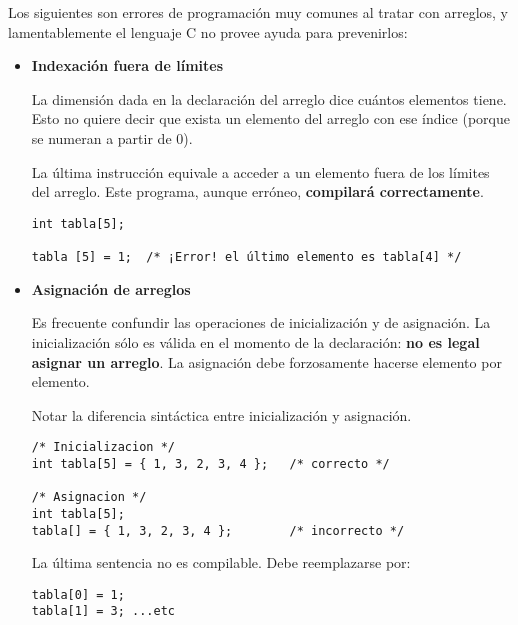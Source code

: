 Los siguientes son errores de programación muy comunes al tratar con arreglos, y lamentablemente el lenguaje C no
provee ayuda para prevenirlos:
\begin{itemize}
\item \textbf{Indexación fuera de límites}
	
La dimensión dada en la declaración del arreglo dice cuántos elementos tiene.
Esto no quiere decir que exista un elemento del arreglo con ese índice (porque
se numeran a partir de 0).


\begin{ejemplo}
La última instrucción equivale a acceder a un elemento fuera de los límites del
arreglo. Este programa, aunque erróneo, \textbf{compilará correctamente}. 
\begin{lstlisting}
int tabla[5];

tabla [5] = 1;	/* ¡Error! el último elemento es tabla[4] */
\end{lstlisting}
\end{ejemplo}





\item \textbf{Asignación de arreglos}

Es frecuente confundir las operaciones de inicialización y de asignación. La
inicialización sólo es válida en el momento de la declaración: \textbf{no es legal
asignar un arreglo}. La asignación debe forzosamente hacerse elemento por
elemento.

\begin{ejemplo}
Notar la diferencia sintáctica entre inicialización y asignación.
\begin{lstlisting}
/* Inicializacion */
int tabla[5] = { 1, 3, 2, 3, 4 }; 	/* correcto */

/* Asignacion */
int tabla[5];
tabla[] = { 1, 3, 2, 3, 4 }; 		/* incorrecto */
\end{lstlisting}
La última sentencia no es compilable. Debe reemplazarse por:
\begin{lstlisting}
tabla[0] = 1;
tabla[1] = 3; ...etc
\end{lstlisting}
\end{ejemplo}
\end{itemize}
